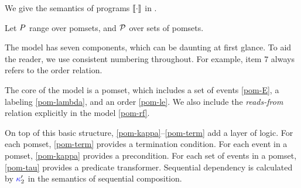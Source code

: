 We give the semantics of programs $\sembase{}$ in .

Let $P$ range over pomsets, and $\mathcal{P}$ over sets of pomsets.

The model has seven components, which can be daunting at first glance.  To
aid the reader, we use consistent numbering throughout. For example, item $7$
always refers to the order relation.

The core of the model is a pomset, which includes a set of events
\eqref{pom-E}, a labeling \eqref{pom-lambda}, and an order \eqref{pom-le}.
We also include the \emph{reads-from} relation explicitly in the model
\eqref{pom-rf}.

On top of this basic structure, \ref{pom-kappa}--\ref{pom-term} add a layer
of logic.  For each pomset, \ref{pom-term} provides a termination condition.
For each event in a pomset, \ref{pom-kappa} provides a precondition.  For
each set of events in a pomset, \ref{pom-tau} provides a predicate
transformer.  Sequential dependency is calculated by ${\color{blue}\kappa}'_2$ in
the semantics of sequential composition.

